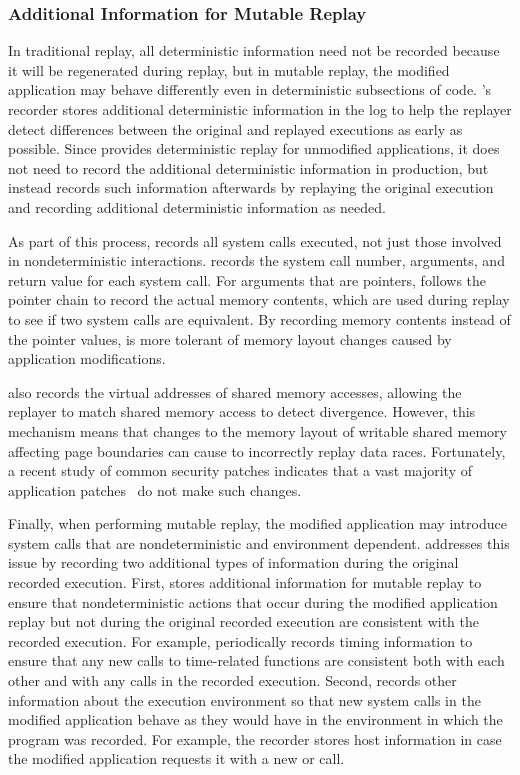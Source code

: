 \subsubsection{Additional Information for Mutable Replay}

In traditional replay, all deterministic information need not be
recorded because it will be regenerated during replay, but in mutable
replay, the modified application may behave differently even in
deterministic subsections of code.  {\dora}'s recorder stores
additional deterministic information in the log to help the replayer
detect differences between the original and replayed
executions as early as possible.  Since {\dora} provides deterministic replay for
unmodified applications, it does not need to record the additional
deterministic information in production, but instead records such
information afterwards by replaying the original
execution and recording additional deterministic information as
needed.

As part of this process, {\dora} records all system calls executed, not just those
involved in nondeterministic interactions.  {\dora} records the
system call number, arguments, and return value for each system
call. For arguments that are pointers, {\dora} follows the pointer
chain to record the actual memory contents, which are used during
replay to see if two system calls are equivalent.  By recording memory
contents instead of the pointer values, {\dora} is more tolerant of
memory layout changes caused by application modifications.

{\dora} also records the virtual addresses of shared memory accesses,
allowing the replayer to match shared memory access to detect divergence.
However, this mechanism means that changes to the memory layout of
writable shared memory affecting page
boundaries can cause {\dora} to incorrectly replay data races.
Fortunately, a recent study of common security patches indicates that
a vast majority of application
patches~\cite{mreplay-feas} do not make such changes.

Finally, when performing mutable replay, the modified application
may introduce system calls that are nondeterministic and environment
dependent.  {\dora} addresses this issue by recording two
additional types of information during the original recorded
execution.  First, {\dora} stores additional
information for mutable replay to ensure that nondeterministic actions
that occur during the modified application replay but not during the
original recorded execution are consistent with the recorded
execution.  For example, {\dora} periodically
records timing information to ensure that any new calls to time-related
functions are consistent both with each other and with any calls in the recorded execution.
Second, {\dora} records other information about the execution environment so
that new system calls in the modified application behave as they would have in
the environment in which the program was recorded.
For example, the recorder stores
host information in case the modified application requests it with a new
 or  call.
